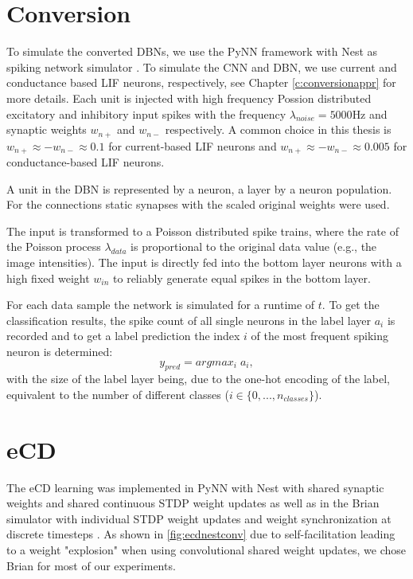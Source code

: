 \section{Conversion} \label{c:conversionimpl}

To simulate the converted DBNs, we use the PyNN framework with Nest as spiking network simulator \cite{10.3389/neuro.11.011.2008}\cite{Gewaltig:NEST}.
To simulate the CNN and DBN, we use current and conductance based LIF neurons, respectively, see Chapter \ref{c:conversionappr} for more details.
Each unit is injected with high frequency Possion distributed excitatory and inhibitory input spikes with the frequency $\lambda_{noise}= 5000 \text{Hz}$ and synaptic weights $w_{n+}$ and $w_{n-}$ respectively.
A common choice in this thesis is $w_{n+} \approx - w_{n-} \approx 0.1$ for current-based LIF neurons and  $w_{n+} \approx - w_{n-} \approx 0.005$ for conductance-based LIF neurons.

A unit in the DBN is represented by a neuron, a layer by a neuron population.
For the connections static synapses with the scaled original weights were used. 

The input is transformed to a Poisson distributed spike trains, where the rate of the Poisson process $\lambda_{data}$ is proportional to the original data value (e.g., the image intensities). 
The input is directly fed into the bottom layer neurons with a high fixed weight $w_{in}$ to reliably generate equal spikes in the bottom layer.    

For each data sample the network is simulated for a runtime of $t$. 
To get the classification results, the spike count of all single neurons in the label layer $a_i$ is recorded and to get a label prediction the index $i$ of the most frequent spiking neuron is determined:
\[
y_{pred} = argmax_i \; a_i,
\]
with the size of the label layer being, due to the one-hot encoding of the label, equivalent to the number of different classes ($i \in \{0,..., n_{classes}\}$). 

\section{eCD} \label{c:ecdimpl}

The eCD learning was implemented in PyNN with Nest with shared synaptic weights and shared continuous STDP weight updates as well as in the Brian simulator with individual STDP weight updates and weight synchronization at discrete timesteps \cite{10.3389/neuro.11.011.2008}\cite{Gewaltig:NEST}\cite{10.3389/neuro.11.005.2008}. 
As shown in \ref{fig:ecdnestconv} due to self-facilitation leading to a weight "explosion" when using convolutional shared weight updates, we chose Brian for most of our experiments.

